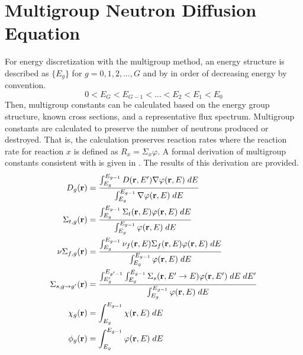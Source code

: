 \section{Multigroup Neutron Diffusion Equation}
  
  For energy discretization with the multigroup method, an energy structure is 
  described as $\{E_g\}$ for $g = 0,1,2,\ldots,G$ and by in order of decreasing 
  energy by convention.
  \[ 0 < E_G < E_{G-1} < \ldots < E_2 < E_1 < E_0 \]
  Then, multigroup constants can be calculated based on the energy group 
  structure, known cross sections, and a representative flux spectrum.
  Multigroup constants are calculated to preserve the number of neutrons 
  produced or destroyed. That is, the calculation preserves reaction rates where
  the reaction rate for reaction $x$ is defined as $R_x=\Sigma_x \varphi$. 
  A formal derivation of multigroup constants consistent with
   is given in \cite{duderstathamilton}. The
  results of this derivation are provided.
  \begin{align}
    D_g(\mathbf{r}) &= \frac{\int_{E_g}^{E_{g-1}} D(\mathbf{r},E') \mathbf{\nabla} \varphi(\mathbf{r},E)\;dE}
      {\int_{E_g}^{E_{g-1}} \mathbf{\nabla} \varphi(\mathbf{r},E)\;dE} \\
    \Sigma_{t,g}(\mathbf{r}) &= \frac{\int_{E_g}^{E_{g-1}} \Sigma_t(\mathbf{r},E) 
      \varphi(\mathbf{r},E)\;dE}{\int_{E_g}^{E_{g-1}} \varphi(\mathbf{r},E)\;dE} \\
    \nu\Sigma_{f,g}(\mathbf{r}) &= \frac{\int_{E_g}^{E_{g-1}} \nu_f(\mathbf{r},E)
      \Sigma_f(\mathbf{r},E) \varphi(\mathbf{r},E)\;dE}{\int_{E_g}^{E_{g-1}} 
      \varphi(\mathbf{r},E)\;dE} \\
    \Sigma_{s,g\rightarrow g'}(\mathbf{r}) &= \frac{\int_{E_g'}^{E_{g'-1}} 
      \int_{E_g}^{E_{g-1}} \Sigma_s(\mathbf{r},E' \rightarrow E) 
      \varphi(\mathbf{r},E')\;dE\;dE'}
      {\int_{E_g}^{E_{g-1}} \varphi(\mathbf{r},E)\;dE}  \\
    \chi_g(\mathbf{r}) &= \int_{E_g}^{E_{g-1}} \chi(\mathbf{r},E) \; dE \\
    \phi_g(\mathbf{r}) &= \int_{E_g}^{E_{g-1}} \varphi(\mathbf{r},E) \; dE
  \end{align}

